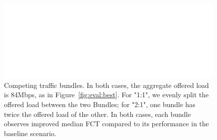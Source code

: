 \begin{figure}
    \centering
\begin{knitrout}
\color{fgcolor}\begin{kframe}


{\ttfamily\noindent\bfseries\color{errorcolor}{\#\# Error: Faceting variables must have at least one value}}\end{kframe}
\includegraphics[width=\maxwidth]{figure/robust:twobundler-1} 

\end{knitrout}
    \caption{Competing traffic bundles. In both cases, the aggregate offered load is 84Mbps, as in Figure~\ref{fig:eval:best}. For "1:1", we evenly split the offered load between the two Bundles; for "2:1", one bundle has twice the offered load of the other. In both cases, each bundle observes improved median FCT compared to its performance in the baseline scenario.}
    \label{fig:robust:twobundler}
\end{figure}
